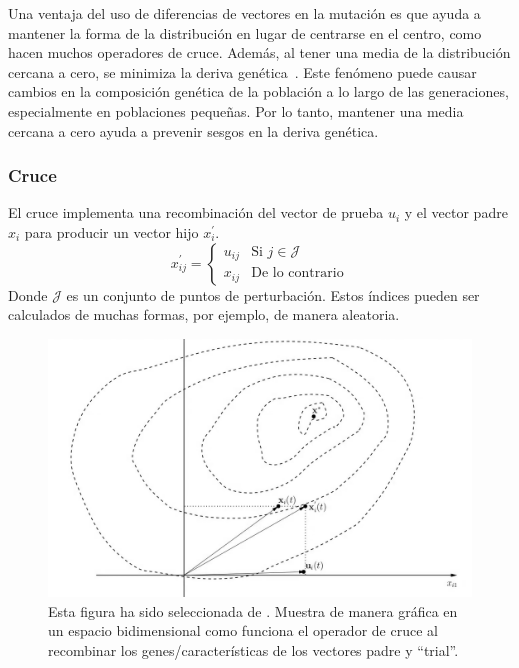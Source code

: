 Una ventaja del uso de diferencias de vectores en la mutación es que ayuda a mantener la forma de la distribución en lugar de centrarse en el centro, como hacen muchos operadores de cruce. Además, al tener una media de la distribución cercana a cero, se minimiza la deriva genética~\cite{10.5555/1557464}. Este fenómeno puede causar cambios en la composición genética de la población a lo largo de las generaciones, especialmente en poblaciones pequeñas. Por lo tanto, mantener una media cercana a cero ayuda a prevenir sesgos en la deriva genética.

\subsubsection{Cruce}
El cruce implementa una recombinación del vector de prueba $u_i$ y el vector padre $x_i$ para producir un vector hijo $x^\prime_i$.
\begin{equation}
    x^\prime_{ij}=\begin{cases} u_{ij} & \text{Si $j\in \mathcal{J}$} \\ x_{ij} & \text{De lo contrario} \end{cases}
\end{equation}
Donde $\mathcal{J}$ es un conjunto de puntos de perturbación. Estos índices pueden ser calculados de muchas formas, por ejemplo, de manera aleatoria.

\begin{figure}[htp]
    \begin{center}
        \includegraphics[width=1\textwidth]{imagenes/de-crossover.png}
    \end{center}
    \caption[Crossover en DE]{Esta figura ha sido seleccionada de \cite{10.5555/1557464}. Muestra de manera gráfica en un espacio bidimensional como funciona el operador de cruce al recombinar los genes/características de los vectores padre y ``trial''.}
\end{figure}

